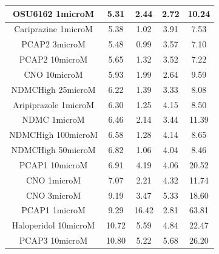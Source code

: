 \documentclass[a4paper,12pt]{article}
\begin{document}
\begin{table}[h!]
\begin{tabular}{|c|c|c|c|c|}
OSU6162 1microM       & 5.31  & 2.44  & 2.72 & 10.24 \\ \hline
Cariprazine 1microM   & 5.38  & 1.02  & 3.91 & 7.53  \\ \hline
PCAP2 3microM         & 5.48  & 0.99  & 3.57 & 7.10   \\ \hline
PCAP2 10microM        & 5.65  & 1.32  & 3.52 & 7.22  \\ \hline
CNO 10microM          & 5.93  & 1.99  & 2.64 & 9.59  \\ \hline
NDMCHigh 25microM     & 6.22  & 1.39  & 3.33 & 8.08  \\ \hline
Aripiprazole 1microM  & 6.30   & 1.25  & 4.15 & 8.50   \\ \hline
NDMC 1microM          & 6.46  & 2.14  & 3.44 & 11.39 \\ \hline
NDMCHigh 100microM    & 6.58  & 1.28  & 4.14 & 8.65  \\ \hline
NDMCHigh 50microM     & 6.82  & 1.06  & 4.04 & 8.46  \\ \hline
PCAP1 10microM        & 6.91  & 4.19  & 4.06 & 20.52 \\ \hline
CNO 1microM           & 7.07  & 2.21  & 4.32 & 11.74 \\ \hline
CNO 3microM           & 9.19  & 3.47  & 5.33 & 18.60  \\ \hline
PCAP1 1microM         & 9.29  & 16.42 & 2.81 & 63.81 \\ \hline
Haloperidol 10microM  & 10.72 & 5.59  & 4.84 & 22.47 \\ \hline
PCAP3 10microM      & 10.80  & 5.22  & 5.68 & 26.20  \\ \hline
\end{tabular}
\end{table}
\newpage
\end{document}
